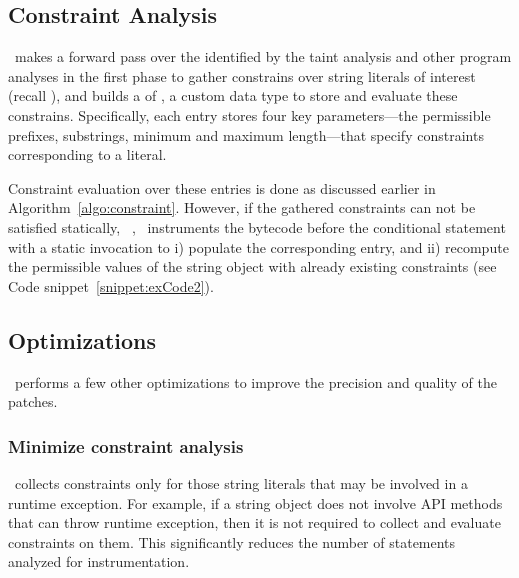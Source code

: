 \subsection{Constraint Analysis}
\label{subsec:constraint analysis}

\tool\ makes a forward pass over the  identified by the taint
analysis and other program analyses in the first phase to gather constrains over
string literals of interest (recall ), and builds a
 of , a custom data type to store and
evaluate these constrains. Specifically, each  entry
stores four key parameters---the permissible prefixes, substrings, minimum and
maximum length---that specify constraints corresponding to a 
literal.

Constraint evaluation over these  entries is done as
discussed earlier in Algorithm~\ref{algo:constraint}. However, if the gathered
constraints can not be satisfied statically, \eg\
, \tool\ instruments the bytecode before the
conditional statement with a static invocation to i) populate the corresponding
\code{ConstraintDataType} entry, and ii) recompute the permissible values of the
string object with already existing constraints (see Code
snippet~\ref{snippet:exCode2}).


\subsection{Optimizations}
\label{subsec:optimizations}

\tool\ performs a few other optimizations to improve the precision and quality
of the patches.

\subsubsection{Minimize constraint analysis}
\label{subsubsec:minimizeConstrintInstrumentation}

\tool\ collects constraints only for those string literals that may be involved
in a runtime exception. For example, if a string object does not involve API
methods that can throw runtime exception, then it is not required to collect and
evaluate constraints on them. This significantly reduces the number of
statements analyzed for instrumentation.
 
